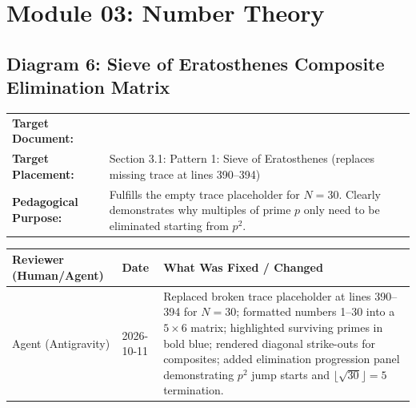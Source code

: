 \documentclass[11pt,a4paper]{article}
\newcommand{\breadcrumb}[3]{
    \par\vspace{0.15cm}
    \noindent\begin{tabularx}{\textwidth}{|l|X|}
    \hline
    \textbf{Target Document:} & \texttt{\detokenize{#1}} \\
    \textbf{Target Placement:} & #2 \\
    \textbf{Pedagogical Purpose:} & #3 \\
    \hline
    \end{tabularx}
    \vspace{0.15cm}\par
}
\newcommand{\diagramaudit}[3]{
    \par\vspace{0.12cm}
    \noindent\begin{tabularx}{\textwidth}{|l|l|>{\raggedright\arraybackslash}X|}
    \hline
    \textbf{Reviewer (Human/Agent)} & \textbf{Date} & \textbf{What Was Fixed / Changed} \\ \hline
    #1 & #2 & #3 \\ \hline
    \end{tabularx}
    \vspace{0.12cm}\par
}
\begin{document}
\newpage
\section{Module 03: Number Theory}

\subsection{Diagram 6: Sieve of Eratosthenes Composite Elimination Matrix}

\breadcrumb{03.number_theory.tex}{Section 3.1: Pattern 1: Sieve of Eratosthenes (replaces missing trace at lines 390--394)}{Fulfills the empty trace placeholder for $N=30$. Clearly demonstrates why multiples of prime $p$ only need to be eliminated starting from $p^2$.}

\diagramaudit{Agent (Antigravity)}{2026-10-11}{Replaced broken trace placeholder at lines 390--394 for $N=30$; formatted numbers 1--30 into a $5 \times 6$ matrix; highlighted surviving primes in bold blue; rendered diagonal strike-outs for composites; added elimination progression panel demonstrating $p^2$ jump starts and $\lfloor\sqrt{30}\rfloor=5$ termination.}
\end{document}
